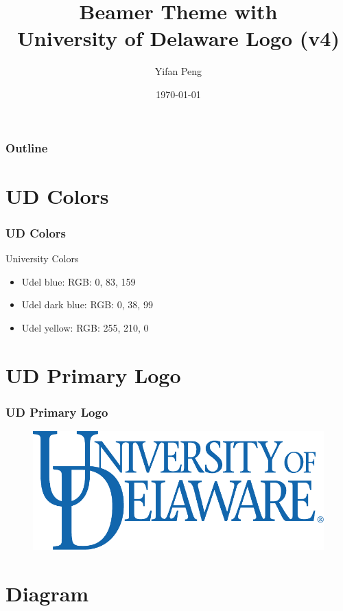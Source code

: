 \documentclass{beamer}
\title{Beamer Theme with \\University of Delaware Logo (v4)}
\author[Yifan Peng]{Yifan Peng}
\institute[Computer \& Information Sciences]{Computer \& Information
Sciences}
\date[today]{\today}
\begin{document}
\begin{frame}[plain]
    \titlepage
\end{frame}

\begin{frame}
  \frametitle{Outline} 
  \tableofcontents[hideallsubsections]
\end{frame}

\section{UD Colors}

\begin{frame}
	\frametitle{UD Colors}
	\begin{exampleblock}{University Colors}
	\begin{itemize}
	  \item Udel blue: \textcolor{udelblue}{RGB: 0, 83, 159}
	  \item Udel dark blue: \textcolor{udeldarkblue}{RGB: 0, 38, 99}
	  \item Udel yellow: \textcolor{udelyellow}{RGB: 255, 210, 0}
	\end{itemize}
	\end{exampleblock}
\end{frame}

\section{UD Primary Logo}

\begin{frame}
	\frametitle{UD Primary Logo}
	\begin{figure}
		\includegraphics[width=.5\textwidth]{UDPrimaryLogo2945.pdf}
	\end{figure}
\end{frame}

\section{Diagram}
\end{document}
